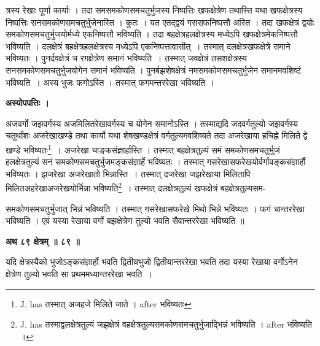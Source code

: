 \documentclass[11pt, openany]{book}
\begin{document}
\newpage

\noindent त्रस्य रेखाः पूर्णा कार्याः । तदा समसमकोणसमचतुर्भुजस्य निष्पत्तिः खफक्षेत्रेण तथास्ति यथा खफक्षेत्रस्य निष्पत्तिः
सनसमकोणसमचतुर्भुजेनास्ति । कुतः । यत एतद्द्वयं गससफनिष्पत्तौ अस्ति । तदा खफक्षेत्रं द्वयोः समकोणसमचतुर्भुजयोर्मध्ये एकनिष्पत्तौ भविष्यति । तदा बहक्षेत्रहलक्षेत्रस्य मध्येऽपि खफक्षेत्रमेकनिष्पत्तौ भविष्यति । दलक्षेत्रं बहक्षेत्रहलक्षेत्रस्य मध्येऽपि एकनिष्पत्तावासीत्~। तस्मात् दलक्षेत्रखफक्षेत्रे समाने भविष्यतः । पुनर्दवक्षेत्रं च रगक्षेत्रेण समानं भविष्यति~। तस्मात् जवक्षेत्रं
तसशक्षेत्रस्य सनसमकोणसमचतुर्भुजयोगेन समानं भविष्यति । पुनर्बझशेषक्षेत्रं
नमसमकोणसमचतुर्भुजेन समानमवशिष्टं भविष्यति~। अस्य भुजः फगोऽस्ति । तस्मात् फगमन्तररेखा भविष्यति । \\
\vspace{5mm}

\begin{center}
\textbf{\large अस्योपपत्तिः । }
\end{center}
\vspace{5mm}

अजवर्गो जझवर्गस्य अजमिलितरेखावर्गस्य च योगेन समानोऽस्ति । तस्माद्यदि जदवर्गतुल्यो जझवर्गस्य चतुर्थांशः अजरेखाखण्डे तथा कार्यो यथा शेषखण्डक्षेत्रं वर्गतुल्यमवशिष्यते तदा अजरेखाया हचिह्ने मिलिते द्वे खण्डे भविष्यतः\renewcommand{\thefootnote}{१}\footnote{{\en J. has} तस्मात् अजहजे मिलिते जाते । {\en after} भविष्यतः }~। अजरेखा चाङ्कसंज्ञार्हास्ति ।
तस्मात् बहक्षेत्रतुल्यं समं समकोणसमचतुर्भुजं हलक्षेत्रतुल्यं
सनं समकोणसमचतुर्भुजमङ्कसंज्ञार्हे भविष्यतः । तस्मात् गसरेखासफरेखयोर्वर्गावङ्कसंज्ञार्हौ भविष्यतः । झजरेखा अजरेखातो भिन्नास्ति~। तस्मात् दजरेखा जझरेखाया मिलितापि मिलितअहरेखाअजरेखयोर्भिन्ना भविष्यति\renewcommand{\thefootnote}{२}\footnote{{\en J. has} तस्माद्वलक्षेत्रतुल्यं जझक्षेत्रं वहक्षेत्रतुल्यसमकोणसमचतुर्भुजाद्भिन्नं भविष्यति ।
{\en after} भविष्यति ।}~। तस्मात् दलक्षेत्रतुल्यं खफक्षेत्रं बहक्षेत्रतुल्यसम-

\newpage
\noindent समकोणसमचतुर्भुजात् भिन्नं भविष्यति । तस्मात् गसरेखासफरेखे
मिथो भिन्ने भविष्यतः । फगं चान्तररेखा भविष्यति । एवं यस्या
रेखाया वर्गो बझक्षेत्रेण तुल्यो भवति सैवान्तररेखा भविष्यति ॥ \\
\begin{center}
\textbf{अथ ८९ क्षेत्रम् ॥ ८९ ॥}
\end{center}
\vspace{5mm}

{\ab यदि क्षेत्रस्यैको भुजोऽङ्कसंज्ञार्हो भवति द्वितीयभुजो द्वितीयान्तररेखा भवति तदा यस्या रेखाया वर्गोऽनेन क्षेत्रेण तुल्यो भवति सा प्रथममध्यान्तररेखा भवति~। }\\
\vspace{3mm}
\end{document}
